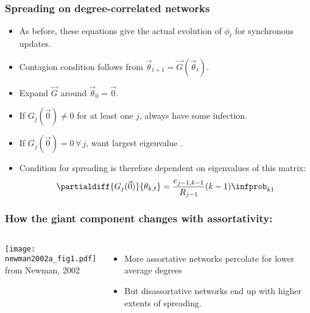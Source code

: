 \begin{frame}
  \frametitle{Spreading on degree-correlated networks}

  \begin{itemize}
  \item<1->
    As before, these equations give the actual evolution
    of $\phi_t$ for synchronous updates.
  \item<2->
    Contagion condition follows from $\vec{\theta}_{t+1} = \vec{G}(\vec{\theta}_{t})$.
  \item<3->
    Expand $\vec{G}$ around $\vec{\theta}_{0}=\vec{0}$.
  \item<5->
    If $G_j(\vec{0}) \ne 0$ for at least one $j$, always have some infection.
  \item<5->
    If $G_j(\vec{0}) = 0 \, \forall \, j$, want largest eigenvalue
    .
  \item<6-> 
    Condition for spreading is therefore
    dependent on eigenvalues of this matrix:
    $$
    \partialdiff{G_j(\vec{0})}{\theta_{k,t}} 
    = 
    \frac{e_{j-1,k-1}}{R_{j-1}}
    (k-1)
    \infprob_{k1}
    $$
\end{itemize}

\end{frame}

\begin{frame}
  \frametitle{How the giant component changes with assortativity:}

  \begin{columns}
    \texttt{[image: newman2002a\_fig1.pdf]}\\
    {\tiny from Newman, 2002\cite{newman2002a}}
    \begin{itemize}
    \item 
      More assortative networks percolate for
      lower average degrees
    \item 
      But disassortative networks end up with
      higher extents of spreading.
    \end{itemize}
  \end{columns}
\end{frame}
